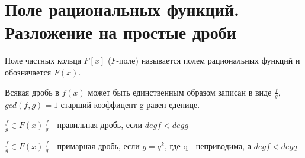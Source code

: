 \section{Поле рациональных функций. Разложение на простые дроби}
\begin{Def}
Поле частных кольца $F[x]$ ($F$-поле) называется полем рациональных функций и обозначается $F(x)$.
\end{Def}

\begin{Def}
Всякая дробь в $f(x)$ может быть единственным образом записан в виде $\frac{f}{g}$, $gcd(f, g) = 1$
старший коэффицент g равен еденице.
\end{Def}

\begin{Def}                                                                      
$\frac{f}{g} \in F(x)\, \frac{f}{g}$ - правильная дробь, если $deg f < deg g$ 
\end{Def}

\begin{Def}                                                                      
$\frac{f}{g} \in F(x)\, \frac{f}{g}$ - примарная дробь, если $g = q^k$, где q - неприводима,
а $deg f < deg q$  
\end{Def}

